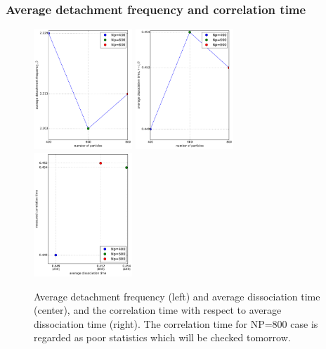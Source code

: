 \documentclass[slidestop, compress, mathserif]{beamer}
\begin{document}

\begin{frame}
  \frametitle<presentation>{Average detachment frequency and correlation time}
  \begin{figure}
    \centering
    \includegraphics[width=0.33\textwidth]{../check_beta.pdf}
    \includegraphics[width=0.33\textwidth]{../check_tau.pdf}
    \includegraphics[width=0.33\textwidth]{../correlation_time_tau.pdf}
    \caption{Average detachment frequency (left) and average dissociation time (center), and the correlation time with respect to average dissociation time (right). The correlation time for NP=800 case is regarded as poor statistics which will be checked tomorrow.}
  \end{figure}
\end{frame}
\end{document}
